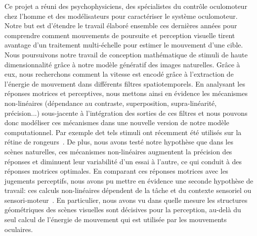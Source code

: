 \documentclass[11pt,french,a4paper,oneside]{article}%
\begin{document}
Ce projet a réuni des psychophysiciens, des spécialistes du contrôle oculomoteur chez l'homme et des modélisateurs pour caractériser le système oculomoteur. Notre but est d'étendre le travail élaboré ensemble ces dernières années pour comprendre comment mouvements de poursuite et perception visuelle tirent avantage d'un traitement multi-échelle pour estimer le mouvement d'une cible. Nous poursuivons notre travail de conception mathématique de stimuli de haute dimensionnalité grâce à notre modèle génératif des images naturelles. Grâce à eux, nous recherchons comment la vitesse est encodé grâce à l'extraction de l'énergie de mouvement dans différents filtres spatiotemporels. En analysant les réponses motrices et perceptives, nous mettons ainsi en évidence les mécanismes non-linéaires (dépendance au contraste, superposition, supra-linéarité, précision...) sous-jacente à l'intégration des sorties de ces filtres et nous pouvons donc modéliser ces mécanismes dans une nouvelle version de notre modèle computationnel. Par exemple det tels stimuli ont récemment été utilisés sur la rétine de rongeurs~\citep{Ravello19}. De plus, nous avons testé notre hypothèse que dans les scènes naturelles, ces mécanismes non-linéaires augmentent la précision des réponses et diminuent leur variabilité d'un essai à l'autre, ce qui conduit à des réponses motrices optimales. En comparant ces réponses motrices avec les jugements perceptifs, nous avons pu mettre en évidence une seconde hypothèse de travail: ces calculs non-linéaires dépendent de la tâche et du contexte sensoriel ou sensori-moteur~\citep{Simoncini12}. En particulier, nous avons vu dans quelle mesure les structures géométriques des scènes visuelles sont décisives pour la perception, au-delà du seul calcul de l'énergie de mouvement qui est utilisée par les mouvements oculaires. %
\end{document}
